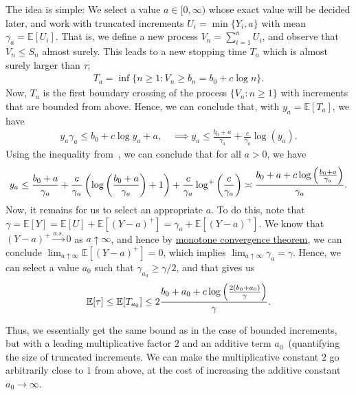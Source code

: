\documentclass[12pt]{article}
\begin{document}
The idea is simple: We select a value $a \in [0, \infty)$ whose exact value will be decided later, and work with truncated increments $U_i = \min \{Y_i, a\}$ with mean $\gamma_a = \mathbb{E}[U_i]$. That is, we define a new process $V_n = \sum_{i=1}^n U_i$, and observe that $V_n \leq S_n$ almost surely. This leads to a new stopping time $T_a$ which is almost surely larger than $\tau$; 
\begin{align}
    T_a = \inf \{n \geq 1: V_n \geq b_n = b_0 + c \log n\}. 
\end{align}
Now, $T_a$ is the first boundary crossing of the process $\{V_n: n \geq 1\}$ with increments that are bounded from above. Hence, we can conclude that, with $y_a = \mathbb{E}[T_a]$, we have 
\begin{align}
    y_a \gamma_a \leq b_0 + c \log y_a + a, \quad \implies y_a \leq \frac{b_0 + a}{\gamma_a} + \frac{c}{\gamma_a} \log (y_a). 
\end{align}
Using the inequality from~, we can conclude that for all $a>0$, we have 
\begin{align}
    y_a \leq \frac{b_0+ a}{\gamma_a} + \frac{c}{\gamma_a} \left( \log \left( \frac{b_0 + a}{\gamma_a} \right)  + 1\right) + \frac{c}{\gamma_a} \log^+\left( \frac{c}{\gamma_a} \right)  \asymp \frac{b_0 + a + c \log\left( \frac{b_0 + a}{\gamma_a} \right)}{\gamma_a}. 
\end{align}
Now, it remains for us to select an appropriate $a$. To do this, note that $\gamma = \mathbb{E}[Y] = \mathbb{E}[U] + \mathbb{E}[(Y-a)^+] = \gamma_a + \mathbb{E}[(Y-a)^+]$. We know that $(Y-a)^+ \overset{a.s.}{\to} 0$ as $a \uparrow \infty$, and hence by \href{https://en.wikipedia.org/wiki/Monotone_convergence_theorem}{monotone convergence theorem}, we can conclude $\lim_{a \uparrow \infty} \mathbb{E}[(Y-a)^+] = 0$, which implies $\lim_{a \uparrow \infty} \gamma_a = \gamma$.  Hence, we can select a value $a_0$ such that $\gamma_{a_0} \geq \gamma/2$, and that gives us 
\begin{align}
    \mathbb{E}[\tau] \leq \mathbb{E}[T_{a_0}] \leq 2\frac{b_0 + a_0 + c \log \left( \frac{2(b_0 + a_0)}{\gamma} \right)}{\gamma}. 
\end{align}
\begin{remark}
Thus, we essentially get the same bound as in the case of bounded increments, but with a leading multiplicative factor $2$ and an additive term $a_0$~(quantifying the size of truncated increments. We can make the  multiplicative constant $2$ go arbitrarily close to $1$ from above, at the cost of increasing the additive constant $a_0 \to \infty$. 
\end{remark}
\end{document}

